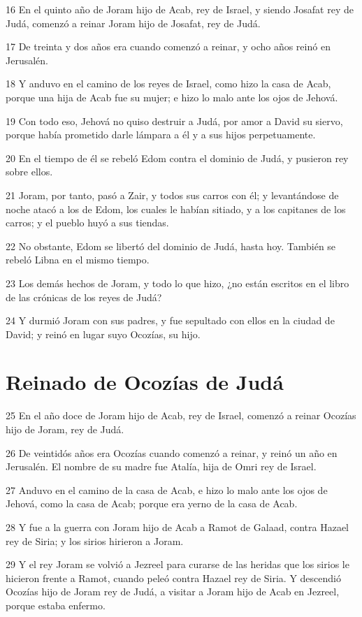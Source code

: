 \par 16 En el quinto año de Joram hijo de Acab, rey de Israel, y siendo Josafat rey de Judá, comenzó a reinar Joram hijo de Josafat, rey de Judá.
\par 17 De treinta y dos años era cuando comenzó a reinar, y ocho años reinó en Jerusalén.
\par 18 Y anduvo en el camino de los reyes de Israel, como hizo la casa de Acab, porque una hija de Acab fue su mujer; e hizo lo malo ante los ojos de Jehová.
\par 19 Con todo eso, Jehová no quiso destruir a Judá, por amor a David su siervo, porque había prometido darle lámpara a él y a sus hijos perpetuamente. 
\par 20 En el tiempo de él se rebeló Edom contra el dominio de Judá, y pusieron rey sobre ellos.
\par 21 Joram, por tanto, pasó a Zair, y todos sus carros con él; y levantándose de noche atacó a los de Edom, los cuales le habían sitiado, y a los capitanes de los carros; y el pueblo huyó a sus tiendas.
\par 22 No obstante, Edom se libertó del dominio de Judá, hasta hoy. También se rebeló Libna en el mismo tiempo.
\par 23 Los demás hechos de Joram, y todo lo que hizo, ¿no están escritos en el libro de las crónicas de los reyes de Judá?
\par 24 Y durmió Joram con sus padres, y fue sepultado con ellos en la ciudad de David; y reinó en lugar suyo Ocozías, su hijo.

\section*{Reinado de Ocozías de Judá }

\par 25 En el año doce de Joram hijo de Acab, rey de Israel, comenzó a reinar Ocozías hijo de Joram, rey de Judá. 
\par 26 De veintidós años era Ocozías cuando comenzó a reinar, y reinó un año en Jerusalén. El nombre de su madre fue Atalía, hija de Omri rey de Israel.
\par 27 Anduvo en el camino de la casa de Acab, e hizo lo malo ante los ojos de Jehová, como la casa de Acab; porque era yerno de la casa de Acab.
\par 28 Y fue a la guerra con Joram hijo de Acab a Ramot de Galaad, contra Hazael rey de Siria; y los sirios hirieron a Joram.
\par 29 Y el rey Joram se volvió a Jezreel para curarse de las heridas que los sirios le hicieron frente a Ramot, cuando peleó contra Hazael rey de Siria. Y descendió Ocozías hijo de Joram rey de Judá, a visitar a Joram hijo de Acab en Jezreel, porque estaba enfermo.

